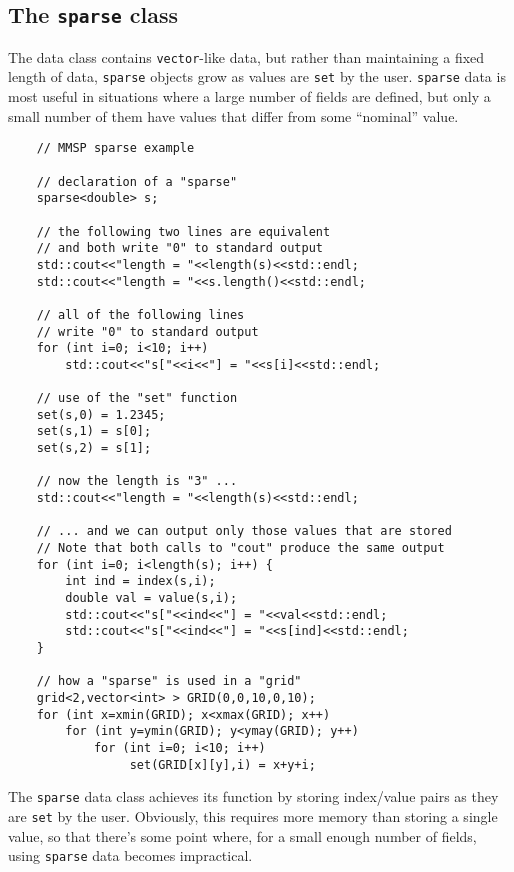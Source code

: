\subsection{The {\tt sparse} class}
The  data class contains {\tt vector}-like data, but rather than maintaining a fixed length of data, {\tt sparse} objects grow as values are {\tt set} by the user.  {\tt sparse} data is most useful in situations where a large number of fields are defined, but only a small number of them have values that differ from some ``nominal'' value.
\begin{shadebox}
\begin{verbatim}
    // MMSP sparse example

    // declaration of a "sparse"
    sparse<double> s;

    // the following two lines are equivalent
    // and both write "0" to standard output
    std::cout<<"length = "<<length(s)<<std::endl;
    std::cout<<"length = "<<s.length()<<std::endl;

    // all of the following lines
    // write "0" to standard output
    for (int i=0; i<10; i++)
        std::cout<<"s["<<i<<"] = "<<s[i]<<std::endl;

    // use of the "set" function
    set(s,0) = 1.2345;
    set(s,1) = s[0];
    set(s,2) = s[1];

    // now the length is "3" ...
    std::cout<<"length = "<<length(s)<<std::endl;

    // ... and we can output only those values that are stored
    // Note that both calls to "cout" produce the same output
    for (int i=0; i<length(s); i++) {
        int ind = index(s,i);
        double val = value(s,i);
        std::cout<<"s["<<ind<<"] = "<<val<<std::endl;
        std::cout<<"s["<<ind<<"] = "<<s[ind]<<std::endl;
	}

    // how a "sparse" is used in a "grid"
    grid<2,vector<int> > GRID(0,0,10,0,10);
    for (int x=xmin(GRID); x<xmax(GRID); x++)
        for (int y=ymin(GRID); y<ymay(GRID); y++)
            for (int i=0; i<10; i++)
                 set(GRID[x][y],i) = x+y+i;
\end{verbatim}
\end{shadebox}
The {\tt sparse} data class achieves its function by storing index/value pairs as they are {\tt set} by the user.  Obviously, this requires more memory than storing a single value, so that there's some point where, for a small enough number of fields, using {\tt sparse} data becomes impractical.

